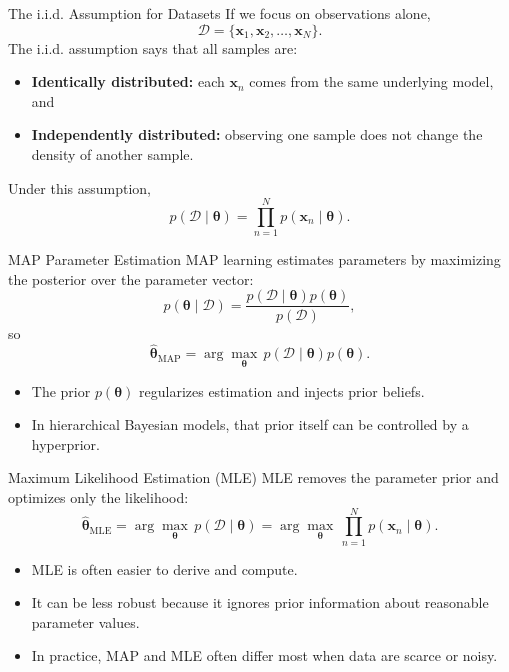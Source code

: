 \documentclass[10pt]{beamer}
\begin{document}
\begin{frame}{The i.i.d. Assumption for Datasets}
  \justifying
  If we focus on observations alone,
  \[
    \mathcal{D} = \{\bm{x}_1,\bm{x}_2,\ldots,\bm{x}_N\}.
  \]
  The i.i.d. assumption says that all samples are:
  \begin{itemize}
    \item \textbf{Identically distributed:} each $\bm{x}_n$ comes from the same underlying model, and
    \item \textbf{Independently distributed:} observing one sample does not change the density of another sample.
  \end{itemize}
  Under this assumption,
  \[
    p(\mathcal{D}\mid\bm{\theta}) = \prod_{n=1}^{N} p(\bm{x}_n\mid\bm{\theta}).
  \]
\end{frame}

\begin{frame}{MAP Parameter Estimation}
  \justifying
  MAP learning estimates parameters by maximizing the posterior over the parameter vector:
  \[
    p(\bm{\theta}\mid\mathcal{D}) = \frac{p(\mathcal{D}\mid\bm{\theta})p(\bm{\theta})}{p(\mathcal{D})},
  \]
  so
  \[
    \hat{\bm{\theta}}_{\mathrm{MAP}} = \arg\max_{\bm{\theta}} \, p(\mathcal{D}\mid\bm{\theta})p(\bm{\theta}).
  \]
  \begin{itemize}
    \item The prior $p(\bm{\theta})$ regularizes estimation and injects prior beliefs.
    \item In hierarchical Bayesian models, that prior itself can be controlled by a hyperprior.
  \end{itemize}
\end{frame}

\begin{frame}{Maximum Likelihood Estimation (MLE)}
  \justifying
  MLE removes the parameter prior and optimizes only the likelihood:
  \[
    \hat{\bm{\theta}}_{\mathrm{MLE}} = \arg\max_{\bm{\theta}} \, p(\mathcal{D}\mid\bm{\theta})
    = \arg\max_{\bm{\theta}} \, \prod_{n=1}^{N} p(\bm{x}_n\mid\bm{\theta}).
  \]
  \begin{itemize}
    \item MLE is often easier to derive and compute.
    \item It can be less robust because it ignores prior information about reasonable parameter values.
    \item In practice, MAP and MLE often differ most when data are scarce or noisy.
  \end{itemize}
\end{frame}
\end{document}

